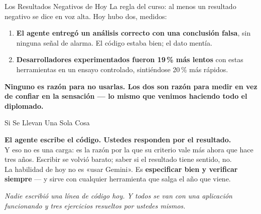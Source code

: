 \documentclass[aspectratio=169, 11pt]{beamer}
\begin{document}
\begin{frame}[shrink=5]{Los Resultados Negativos de Hoy}
  \vspace{4pt}
  {\footnotesize\color{textMuted}
   La regla del curso: al menos un resultado negativo se dice en voz alta.
   Hoy hubo dos, medidos:}
  \vspace{6pt}
  {\footnotesize\color{textMuted}
  \begin{enumerate}\setlength{\itemsep}{6pt}
    \item[{\color{arcaRed}\scriptsize\faTimes}]
      \textbf{El agente entregó un análisis correcto con una conclusión
      falsa}, sin ninguna señal de alarma. El código estaba bien; el dato
      mentía.
    \item[{\color{arcaRed}\scriptsize\faTimes}]
      \textbf{Desarrolladores experimentados fueron 19\,\% más lentos} con
      estas herramientas en un ensayo controlado, sintiéndose 20\,\% más
      rápidos.
  \end{enumerate}}
  \vspace{7pt}
  \begin{tcolorbox}[colback=arcaGray, colframe=arcaDark, boxrule=0pt,
    leftrule=4pt, arc=3pt, left=10pt, right=10pt, top=6pt, bottom=6pt]
    {\footnotesize\color{arcaDark}\bfseries
     Ninguno es razón para no usarlas. Los dos son razón para \textbf{medir
     en vez de confiar en la sensación} --- lo mismo que venimos haciendo
     todo el diplomado.}
  \end{tcolorbox}
\end{frame}

\begin{frame}[shrink=5]{Si Se Llevan Una Sola Cosa}
  \vspace{6pt}
  \begin{tcolorbox}[colback=arcaGray, colframe=arcaRed, boxrule=0pt, leftrule=4pt,
    arc=3pt, left=10pt, right=10pt, top=9pt, bottom=9pt]
    {\large\color{arcaDark}\bfseries
     El agente escribe el código. Ustedes responden por el resultado.}\\[6pt]
    {\footnotesize\color{textMuted}
     Y eso no es una carga: es la razón por la que su criterio vale más
     ahora que hace tres años. Escribir se volvió barato; saber si el
     resultado tiene sentido, no.\\[5pt]
     La habilidad de hoy no es «usar Gemini». Es \textbf{especificar bien y
     verificar siempre} --- y sirve con cualquier herramienta que salga el
     año que viene.}
  \end{tcolorbox}
  \vspace{7pt}
  {\footnotesize\color{arcaDark}\itshape
   Nadie escribió una línea de código hoy. Y todos se van con una aplicación
   funcionando y tres ejercicios resueltos por ustedes mismos.}
\end{frame}
\end{document}
